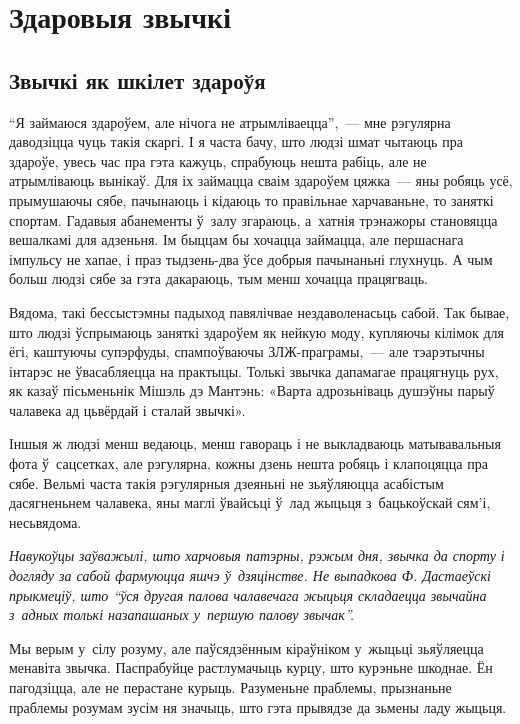 \chapter{Здаровыя звычкі}

\section{Звычкі як шкілет здароўя}

``Я займаюся здароўем, але нічога не атрымліваецца'',~--- мне рэгулярна даводзіцца чуць такія скаргі. І я часта бачу, што людзі шмат чытаюць пра здароўе, увесь час пра гэта кажуць, спрабуюць нешта рабіць, але не атрымліваюць вынікаў. Для іх займацца сваім здароўем цяжка~--- яны робяць усё, прымушаючы сябе, пачынаюць і кідаюць то правільнае харчаваньне, то заняткі спортам. Гадавыя абанементы ў~залу згараюць, а~хатнія трэнажоры становяцца вешалкамі для адзеньня. Ім быццам бы хочацца займацца, але першаснага імпульсу не хапае, і праз тыдзень-два ўсе добрыя пачынаньні глухнуць. А чым больш людзі сябе за гэта дакараюць, тым менш хочацца працягваць.

Вядома, такі бессыстэмны падыход павялічвае нездаволенасьць сабой. Так бывае, што людзі ўспрымаюць заняткі здароўем як нейкую моду, купляючы кілімок для ёгі, каштуючы супэрфуды, спампоўваючы ЗЛЖ-праграмы,~--- але тэарэтычны інтарэс не ўвасабляецца на практыцы. Толькі звычка дапамагае працягнуць рух, як казаў пісьменьнік Мішэль дэ Мантэнь: «Варта адрозьніваць душэўны парыў чалавека ад цьвёрдай і сталай звычкі».


Іншыя ж людзі менш ведаюць, менш гавораць і не выкладваюць матывавальныя фота ў~сацсетках, але рэгулярна, кожны дзень нешта робяць і клапоцяцца пра сябе. Вельмі часта такія рэгулярныя дзеяньні не зьяўляюцца асабістым дасягненьнем чалавека, яны маглі ўвайсьці ў~лад жыцьця з~бацькоўскай сям'і, несьвядома.

\emph{Навукоўцы заўважылі, што харчовыя патэрны, рэжым дня, звычка да спорту і догляду за сабой фармуюцца яшчэ ў~дзяцінстве. Не выпадкова Ф. Дастаеўскі прыкмеціў, што ``ўся другая палова чалавечага жыцьця складаецца звычайна з~адных толькі назапашаных у~першую палову звычак''.}

Мы верым у~сілу розуму, але паўсядзённым кіраўніком у~жыцьці зьяўляецца менавіта звычка. Паспрабуйце растлумачыць курцу, што курэньне шкоднае. Ён пагодзіцца, але не перастане курыць. Разуменьне праблемы, прызнаньне праблемы розумам зусім ня значыць, што гэта прывядзе да зьмены ладу жыцьця.

